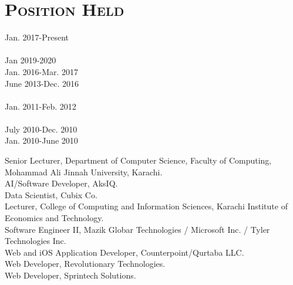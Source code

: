 \documentclass[a4paper, 10pt]{article}
\begin{document}
\section*{\normalfont\textsc{Position Held}}
\begin{minipage}{0.22\textwidth}
Jan. 2017-Present\textcolor{lightgray}{\dotfill}\\\\
Jan 2019-2020\textcolor{lightgray}{\dotfill}\\
Jan. 2016-Mar. 2017\textcolor{lightgray}{\dotfill}\\
June 2013-Dec. 2016\textcolor{lightgray}{\dotfill}\\\\
Jan. 2011-Feb. 2012\textcolor{lightgray}{\dotfill}\\\\
July 2010-Dec. 2010\textcolor{lightgray}{\dotfill}\\
Jan. 2010-June 2010\textcolor{lightgray}{\dotfill}\\
\end{minipage}
\begin{minipage}{0.75\textwidth}
Senior Lecturer, Department of Computer Science, Faculty of Computing, Mohammad Ali Jinnah University, Karachi.\\
AI/Software Developer, AksIQ.\\
Data Scientist, Cubix Co.\\
Lecturer, College of Computing and Information Sciences, Karachi Institute of Economics and Technology.\\
Software Engineer II, Mazik Globar Technologies / Microsoft Inc. / Tyler Technologies Inc.\\
Web and iOS Application Developer, Counterpoint/Qurtaba LLC.\\
Web Developer, Revolutionary Technologies.\\
Web Developer, Sprintech Solutions.
\end{minipage}



\end{document}
